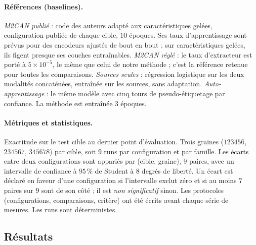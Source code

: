 \documentclass[11pt,a4paper]{article}
\theoremstyle{definition}
\theoremstyle{remark}
\begin{document}
\paragraph{Références (baselines).}
\emph{M2CAN publié} : code des auteurs adapté aux caractéristiques gelées, configuration publiée de chaque cible,
$10$ époques. Ses taux d'apprentissage sont prévus pour des encodeurs ajustés de bout en bout ; sur caractéristiques
gelées, ils figent presque ses couches entraînables. \emph{M2CAN réglé} : le taux d'extracteur est porté à
$5 \times 10^{-5}$, le même que celui de notre méthode ; c'est la référence retenue pour toutes les comparaisons.
\emph{Sources seules} : régression logistique sur les deux modalités concaténées, entraînée sur les sources, sans
adaptation. \emph{Auto-apprentissage} : le même modèle avec cinq tours de pseudo-étiquetage par confiance. La méthode
est entraînée $3$ époques.

\paragraph{Métriques et statistiques.}
Exactitude sur le test cible au dernier point d'évaluation. Trois graines ($123456$, $234567$, $345678$) par cible, soit
$9$ runs par configuration et par famille. Les écarts entre deux configurations sont appariés par (cible, graine),
$9$ paires, avec un intervalle de confiance à $95\,\%$ de Student à $8$ degrés de liberté. Un écart est déclaré en
faveur d'une configuration si l'intervalle exclut zéro et si au moins $7$ paires sur $9$ sont de son côté ; il est
\emph{non significatif} sinon. Les protocoles (configurations, comparaisons, critère) ont été écrits avant chaque série
de mesures. Les runs sont déterministes.

\subsection{Résultats}\label{sec-resultats}
\end{document}
